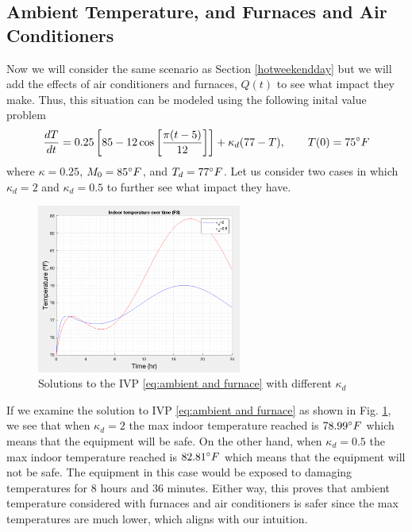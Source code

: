 \documentclass[titlepage]{article}
\begin{document}
\subsection{Ambient Temperature, and Furnaces and Air Conditioners}
Now we will consider the same scenario as Section \ref{hotweekendday} but we will add the effects
of air conditioners and furnaces, $Q(t)$ to see what impact they make. Thus, this situation can be modeled
using the following inital value problem
\begin{equation}\label{eq:ambient and furnace}
    \frac{dT}{dt} = 0.25\left[85 - 12\cos\left[\frac{\pi(t-5)}{12}\right]\right] + \kappa_d(77-T), \qquad T(0)=75\degree F
\end{equation}
where $\kappa=0.25$, $M_0=85\degree F$, and $T_d=77\degree F$. Let us consider two cases in which
$\kappa_d=2$ and $\kappa_d=0.5$ to further see what impact they have.
\begin{figure}[H]
    \centering
    \includegraphics[width=0.6\textwidth]{./images/ambientAndFurnace.png}
    \caption{Solutions to the IVP \eqref{eq:ambient and furnace} with different $\kappa_d$}
    \label{fig:ambient and furnace}
\end{figure}
If we examine the solution to IVP \ref{eq:ambient and furnace} as shown in Fig. \ref{fig:ambient and furnace}, we see that 
when $\kappa_d=2$ the max indoor temperature reached is $78.99\degree F$ which means that the equipment will be safe.
On the other hand, when $\kappa_d=0.5$ the max indoor temperature reached is $82.81\degree F$ which means that 
the equipment will not be safe. The equipment in this case would be exposed to damaging temperatures for
$8$ hours and $36$ minutes. Either way, this proves that ambient temperature considered with
furnaces and air conditioners is safer since the max temperatures are much lower, which
aligns with our intuition.

\end{document}
